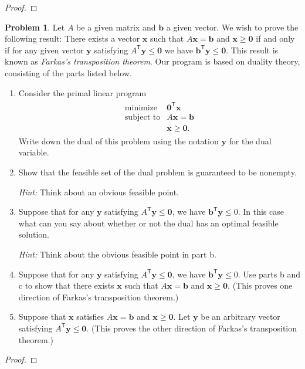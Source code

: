 \documentclass[12pt]{article}
\theoremstyle{definition}
\newtheorem{problem}{Problem}
\newcommand{\vc}[1]{\boldsymbol{#1}}
\newcommand{\tran}{\mathsf{T}}
\begin{document}
\begin{proof}
\end{proof}
\newpage


\begin{problem}
  Let $A$ be a given matrix and $\vc{b}$ a given vector. We wish to prove the
  following result: There exists a vector $\vc{x}$ such that $A\vc{x} = \vc{b}$ and
  $\vc{x} \geq \vc{0}$ if and only if for any given vector $\vc{y}$ satisfying $A^\tran \vc{y} \leq \vc{0}$
  we have $\vc{b}^\tran \vc{y} \leq \vc{0}$. This result is known as \textit{Farkas's transposition theorem}.
  Our program is based on duality theory, consisting of the parts listed below.
  \begin{enumerate}
    \item Consider the primal linear program
      \begin{align*}
        \begin{array}{rl}
          \text{minimize} & \vc{0}^\tran \vc{x} \\
          \text{subject to} & A\vc{x} = \vc{b} \\
          & \vc{x} \geq \vc{0}.
        \end{array}
      \end{align*}
      Write down the dual of this problem using the notation $\vc{y}$ for the dual variable.
    \item Show that the feasible set of the dual problem is guaranteed to be nonempty.

      \textit{Hint:} Think about an obvious feasible point.
    \item Suppose that for any $\vc{y}$ satisfying $A^\tran \vc{y} \leq \vc{0}$,
      we have $\vc{b}^\tran \vc{y} \leq 0$. In this case what can you say about whether
      or not the dual has an optimal feasible solution.

      \textit{Hint:} Think about the obvious feasible point in part b.
    \item Suppose that for any $\vc{y}$ satisfying $A^\tran \vc{y} \leq \vc{0}$,
      we have $\vc{b}^\tran \vc{y} \leq 0$. Use parts b and c to show that there exists
      $\vc{x}$ such that $A\vc{x} = \vc{b}$ and $\vc{x} \geq \vc{0}$. (This proves one
      direction of Farkas's transposition theorem.)
    \item Suppose that $\vc{x}$ satisfies $A\vc{x} = \vc{b}$ and $\vc{x} \geq \vc{0}$.
      Let $\vc{y}$ be an arbitrary vector satisfying $A^\tran \vc{y} \leq \vc{0}$.
      (This proves the other direction of Farkas's transposition theorem.)
  \end{enumerate}
\end{problem}

\begin{proof}
\end{proof}
\newpage
\end{document}
